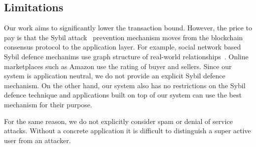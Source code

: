 \subsection{Limitations}
Our work aims to significantly lower the transaction bound.
However, the price to pay is that the Sybil attack~\cite{douceur2002sybil} prevention mechanism moves from the blockchain consensus protocol to the application layer.
For example, social network based Sybil defence mechanims use graph structure of real-world relationships~\cite{yu2006sybilguard}.
Online marketplaces such as Amazon use the rating of buyer and sellers.
Since our system is application neutral, we do not provide an explicit Sybil defence mechanism.
On the other hand, our system also has no restrictions on the Sybil defence technique
and applications built on top of our system can use the best mechanism for their purpose.

For the same reason, we do not explicitly consider spam or denial of service attacks.
Without a concrete application it is difficult to distinguish a super active user from an attacker.





